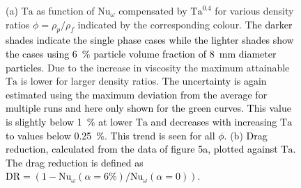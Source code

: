 \documentclass{jfm}
\newcommand\Nus{\text{Nu}}
\newcommand\Tay{\text{Ta}}
\newcommand{\red}[1]{\textcolor{black}{#1}}
\begin{document}
\begin{figure}
\centering
{}
\caption{
(a) $\Tay$ as function of $\Nus_\omega$ compensated by \red{$\Tay^{0.4}$} for
various density ratios $\phi=\rho_p/\rho_f$ indicated by the corresponding
colour. \red{The darker shades indicate the single phase cases while the
lighter shades show the cases using \SI{6}{\percent} particle volume
fraction of \SI{8}{\milli\metre} diameter particles.} Due to the increase
in viscosity the maximum attainable $\Tay$ is lower for larger density
ratios.  \red{ The uncertainty is again estimated using the maximum
deviation from the average for multiple runs and here only shown for
the green curves. This value is slightly below \SI{1}{\percent} at
lower $\Tay$ and decreases with increasing $\Tay$ to values below
\SI{0.25}{\percent}. This trend is seen for all $\phi$.  } (b) \red{%
Drag reduction, calculated from the data of figure 5a, plotted against
$\Tay$. The drag reduction is defined as $\text{DR} = \left(1 -
\Nus_\omega(\alpha=6\%) / \Nus_\omega(\alpha=0) \right)$.
}}
\label{fig:dragReductionDen}
\end{figure}
\end{document}
